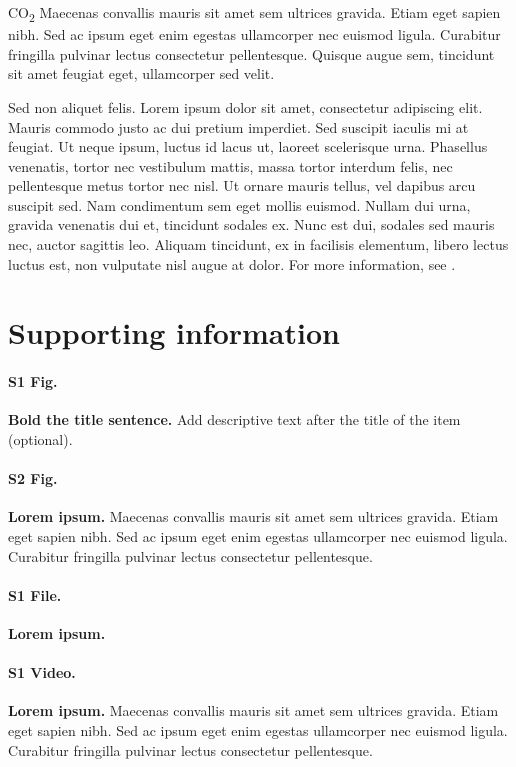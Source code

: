 \documentclass[
  10pt,
  letterpaper,
]{article}
\begin{document}
CO\textsubscript{2} Maecenas convallis mauris sit amet sem ultrices
gravida. Etiam eget sapien nibh. Sed ac ipsum eget enim egestas
ullamcorper nec euismod ligula. Curabitur fringilla pulvinar lectus
consectetur pellentesque. Quisque augue sem, tincidunt sit amet feugiat
eget, ullamcorper sed velit.

Sed non aliquet felis. Lorem ipsum dolor sit amet, consectetur
adipiscing elit. Mauris commodo justo ac dui pretium imperdiet. Sed
suscipit iaculis mi at feugiat. Ut neque ipsum, luctus id lacus ut,
laoreet scelerisque urna. Phasellus venenatis, tortor nec vestibulum
mattis, massa tortor interdum felis, nec pellentesque metus tortor nec
nisl. Ut ornare mauris tellus, vel dapibus arcu suscipit sed. Nam
condimentum sem eget mollis euismod. Nullam dui urna, gravida venenatis
dui et, tincidunt sodales ex. Nunc est dui, sodales sed mauris nec,
auctor sagittis leo. Aliquam tincidunt, ex in facilisis elementum,
libero lectus luctus est, non vulputate nisl augue at dolor. For more
information, see .

\hypertarget{supporting-information}{%
\section{Supporting information}\label{supporting-information}}

\paragraph*{S1 Fig.}
\label{s1-fig}
{\textbf{Bold the title sentence.}} Add descriptive text after the title
of the item (optional).

\paragraph*{S2 Fig.}
\label{s2-fig}
{\textbf{Lorem ipsum.}} Maecenas convallis mauris sit amet sem ultrices
gravida. Etiam eget sapien nibh. Sed ac ipsum eget enim egestas
ullamcorper nec euismod ligula. Curabitur fringilla pulvinar lectus
consectetur pellentesque.

\paragraph*{S1 File.}
\label{s1-file}
{\textbf{Lorem ipsum.}}

\paragraph*{S1 Video.}
\label{s1-video}
{\textbf{Lorem ipsum.}} Maecenas convallis mauris sit amet sem ultrices
gravida. Etiam eget sapien nibh. Sed ac ipsum eget enim egestas
ullamcorper nec euismod ligula. Curabitur fringilla pulvinar lectus
consectetur pellentesque.
\end{document}
